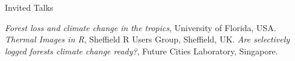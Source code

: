 \begin{rubric}{Invited Talks}

\entry*[2019] \emph{Forest loss and climate change in the tropics}, University of Florida, USA.
\entry*[2017] \emph{Thermal Images in R}, Sheffield R Users Group, Sheffield, UK.
\entry*[2016] \emph{Are selectively logged forests climate change ready?}, Future Cities Laboratory, Singapore.

\end{rubric}